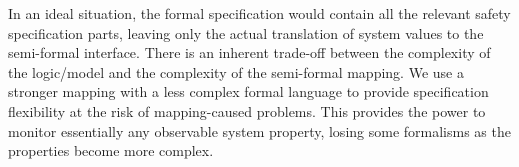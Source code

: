 %
In an ideal situation, the formal specification would contain all the relevant safety specification parts, leaving only the actual translation of system values to the semi-formal interface. 
There is an inherent trade-off between the complexity of the logic/model and the complexity of the semi-formal mapping. 
We use a stronger mapping with a less complex formal language to provide specification flexibility at the risk of mapping-caused problems. 
This provides the power to monitor essentially any observable system property, losing some formalisms as the properties become more complex.






